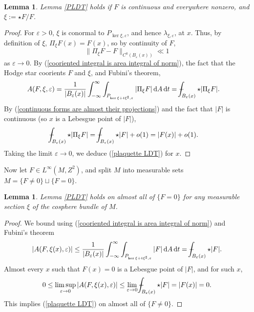 \documentclass[reqno,11pt]{amsart}
\newcommand*\dif{\mathop{}\!\mathrm{d}}
\newtheorem{lemma}[theorem]{Lemma}
\theoremstyle{definition}
\numberwithin{equation}{section}
\def\Xint#1{\mathchoice
{\XXint\displaystyle\textstyle{#1}}%
{\XXint\textstyle\scriptstyle{#1}}%
{\XXint\scriptstyle\scriptscriptstyle{#1}}%
{\XXint\scriptscriptstyle\scriptscriptstyle{#1}}%
\!\int}
\def\XXint#1#2#3{{\setbox0=\hbox{$#1{#2#3}{\int}$ }
\vcenter{\hbox{$#2#3$ }}\kern-.6\wd0}}
\def\dashint{\Xint-}
\begin{document}
\begin{lemma}
Lemma \ref{PLDT} holds if $F$ is continuous and everywhere nonzero, and $\xi := \star F/F$.
\end{lemma}
\begin{proof}
For $\varepsilon > 0$, $\xi$ is conormal to $P_{\ker \xi, \varepsilon}$, and hence $\lambda_{\xi, \varepsilon}$, at $x$.
Thus, by definition of $\xi$, $\Pi_\xi F(x) = F(x)$, so by continuity of $F$,
\begin{equation}\label{continuous forms are almost their projections}
	\|\Pi_\xi F - F\|_{C^0(B_\varepsilon(x))} \ll 1
\end{equation}
as $\varepsilon \to 0$.
By (\ref{cooriented integral is area integral of norm}), the fact that the Hodge star coorients $F$ and $\xi$, and Fubini's theorem,
\begin{align*}
A(F, \xi, \varepsilon)
&= \frac{1}{|B_\varepsilon(x)|} \int_{-\infty}^\infty \int_{P_{\ker \xi + t\xi^\sharp, \varepsilon}} |\Pi_\xi F| \dif A \dif t
= \dashint_{B_\varepsilon(x)} \star |\Pi_\xi F|.
\end{align*}
By (\ref{continuous forms are almost their projections}) and the fact that $|F|$ is continuous (so $x$ is a Lebesgue point of $|F|$),
\begin{align*}
\dashint_{B_\varepsilon(x)} \star |\Pi_\xi F|
&= \dashint_{B_\varepsilon(x)} \star |F| + o(1) = |F(x)| + o(1).
\end{align*}
Taking the limit $\varepsilon \to 0$, we deduce (\ref{plaquette LDT}) for $x$.
\end{proof}

Now let $F \in L^\infty(M, Z^2)$, and split $M$ into measurable sets $M = \{F \neq 0\} \sqcup \{F = 0\}$.

\begin{lemma}
Lemma \ref{PLDT} holds on almost all of $\{F = 0\}$ for any measurable section $\xi$ of the cosphere bundle of $M$.
\end{lemma}
\begin{proof}
We bound using (\ref{cooriented integral is area integral of norm}) and Fubini's theorem
$$|A(F, \xi(x), \varepsilon)| \leq \frac{1}{|B_\varepsilon(x)|} \int_{-\infty}^\infty \int_{P_{\ker \xi + t\xi^\sharp, \varepsilon}} |F| \dif A \dif t = \dashint_{B_\varepsilon(x)} \star |F|.$$
Almost every $x$ such that $F(x) = 0$ is a Lebesgue point of $|F|$, and for such $x$,
$$0 \leq \limsup_{\varepsilon \to 0} |A(F, \xi(x), \varepsilon)| \leq \lim_{\varepsilon \to 0} \dashint_{B_\varepsilon(x)} \star |F| = |F(x)| = 0.$$
This implies (\ref{plaquette LDT}) on almost all of $\{F \neq 0\}$.
\end{proof}
\end{document}
